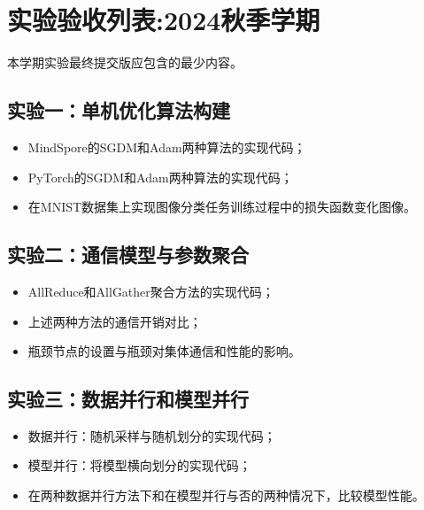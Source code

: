 \chapter{实验验收列表:2024秋季学期}

本学期实验最终提交版应包含的最少内容。

\section{实验一：单机优化算法构建}
\begin{itemize}
    \item MindSpore的SGDM和Adam两种算法的实现代码；
    \item PyTorch的SGDM和Adam两种算法的实现代码；
    \item 在MNIST数据集上实现图像分类任务训练过程中的损失函数变化图像。
\end{itemize}

\section{实验二：通信模型与参数聚合}
\begin{itemize}
    \item AllReduce和AllGather聚合方法的实现代码；
    \item 上述两种方法的通信开销对比；
    \item 瓶颈节点的设置与瓶颈对集体通信和性能的影响。
\end{itemize}

\section{实验三：数据并行和模型并行}
\begin{itemize}
    \item 数据并行：随机采样与随机划分的实现代码；
    \item 模型并行：将模型横向划分的实现代码；
    \item 在两种数据并行方法下和在模型并行与否的两种情况下，比较模型性能。
\end{itemize}
